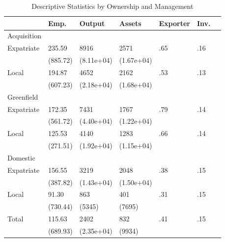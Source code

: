 \documentclass[12pt,a4paper]{article}
\begin{document}
\begin{table}
\caption{Descriptive Statistics by Ownership and Management}
\label{table:desc}
\centering
\begin{tabular}{lllllll} 
\hline
~           & Emp.     & Output     & Assets     & Exporter & Inv.  \\ 
\hline
Acquisition & ~        & ~          & ~          & ~        & ~     \\ 
\hline
Expatriate  & 235.59   & 8916       & 2571       & .65      & .16   \\
~           & (885.72) & (8.11e+04) & (1.67e+04) & ~        & ~     \\
Local       & 194.87   & 4652       & 2162       & .53      & .13   \\
~           & (607.23) & (2.18e+04) & (1.68e+04) & ~        & ~     \\ 
\hline
Greenfield  & ~        & ~          & ~          & ~        & ~     \\ 
\hline
Expatriate  & 172.35   & 7431       & 1767       & .79      & .14   \\
~           & (561.72) & (4.40e+04) & (1.22e+04) & ~        & ~     \\
Local       & 125.53   & 4140       & 1283       & .66      & .14   \\
~           & (271.51) & (1.92e+04) & (1.15e+04) & ~        & ~     \\ 
\hline
Domestic    & ~        & ~          & ~          & ~        & ~     \\ 
\hline
Expatriate  & 156.55   & 3219       & 2048       & .38      & .15   \\
~           & (387.82) & (1.43e+04) & (1.50e+04) & ~        & ~     \\
Local       & 91.30    & 863        & 401        & .31      & .15   \\
~           & (730.44) & (5345)     & (7695)     & ~        & ~     \\ 
\hline
Total       & 115.63   & 2402       & 832        & .41      & .15   \\
~           & (689.93) & (2.35e+04) & (9934)     & ~        & ~     \\
\hline
\end{tabular}
\begin{tablenotes}
			\small
      \item Notes: N = 286,121. The table presents descriptive statistics of firm characteristics.}
    \end{tablenotes}
\end{table}
\end{document}
